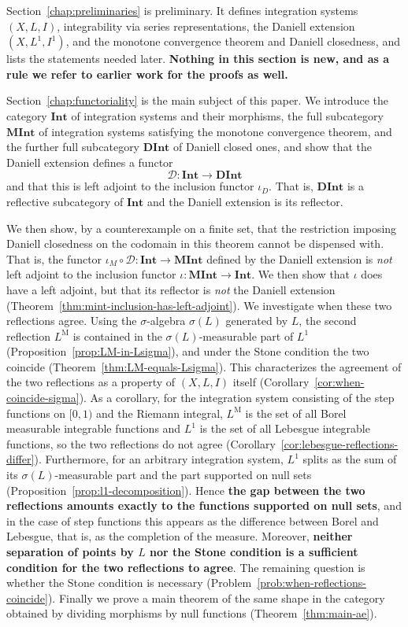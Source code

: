 Section~\ref{chap:preliminaries} is preliminary.
It defines integration systems $(X,L,I)$, integrability via series
representations, the Daniell extension $(X,L^1,I^1)$, and the monotone
convergence theorem and Daniell closedness, and lists the statements needed
later.
\textbf{Nothing in this section is new, and as a rule we refer to earlier work
for the proofs as well.}

Section~\ref{chap:functoriality} is the main subject of this paper.
We introduce the category $\mathbf{Int}$ of integration systems and their
morphisms, the full subcategory $\mathbf{MInt}$ of integration systems
satisfying the monotone convergence theorem, and the further full subcategory
$\mathbf{DInt}$ of Daniell closed ones, and show that the Daniell extension
defines a functor
\[
  \mathcal{D}:\mathbf{Int}\to\mathbf{DInt}
\]
and that this is left adjoint to the inclusion functor $\iota_{D}$.
That is, $\mathbf{DInt}$ is a reflective subcategory of $\mathbf{Int}$ and the
Daniell extension is its reflector.

We then show, by a counterexample on a finite set, that the restriction imposing
Daniell closedness on the codomain in this theorem cannot be dispensed with.
That is, the functor $\iota_M\circ\mathcal{D}:\mathbf{Int}\to\mathbf{MInt}$
defined by the Daniell extension is \emph{not} left adjoint to the inclusion
functor $\iota:\mathbf{MInt}\to\mathbf{Int}$.
We then show that $\iota$ does have a left adjoint, but that its reflector is
\emph{not} the Daniell extension
(Theorem~\ref{thm:mint-inclusion-has-left-adjoint}).
We investigate when these two reflections agree.
Using the $\sigma$-algebra $\sigma(L)$ generated by $L$, the second reflection
$L^{\mathrm{M}}$ is contained in the $\sigma(L)$-measurable part of $L^1$
(Proposition~\ref{prop:LM-in-Lsigma}), and under the Stone condition the two
coincide (Theorem~\ref{thm:LM-equals-Lsigma}).
This characterizes the agreement of the two reflections as a property of
$(X,L,I)$ itself (Corollary~\ref{cor:when-coincide-sigma}).
As a corollary, for the integration system consisting of the step functions on
$[0,1)$ and the Riemann integral, $L^{\mathrm{M}}$ is the set of all Borel
measurable integrable functions and $L^1$ is the set of all Lebesgue integrable
functions, so the two reflections do not agree
(Corollary~\ref{cor:lebesgue-reflections-differ}).
Furthermore, for an arbitrary integration system, $L^1$ splits as the sum of its
$\sigma(L)$-measurable part and the part supported on null sets
(Proposition~\ref{prop:l1-decomposition}).
Hence \textbf{the gap between the two reflections amounts exactly to the
functions supported on null sets}, and in the case of step functions this
appears as the difference between Borel and Lebesgue, that is, as the completion
of the measure.
Moreover, \textbf{neither separation of points by $L$ nor the Stone condition is
a sufficient condition for the two reflections to agree}.
The remaining question is whether the Stone condition is necessary
(Problem~\ref{prob:when-reflections-coincide}).
Finally we prove a main theorem of the same shape in the category obtained by
dividing morphisms by null functions (Theorem~\ref{thm:main-ae}).

